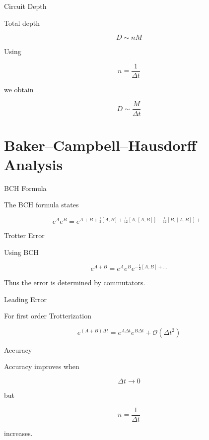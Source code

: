 \documentclass{beamer}
\begin{document}
\begin{frame}{Circuit Depth}

  Total depth

  \[
  D \sim n M
  \]

  Using

  \[
  n = \frac{1}{\Delta t}
  \]

  we obtain

  \[
  D \sim \frac{M}{\Delta t}
  \]

\end{frame}

\section{Baker–Campbell–Hausdorff Analysis}

\begin{frame}{BCH Formula}

  The BCH formula states

  \[
  e^A e^B
  =
  e^{A+B+\frac12[A,B]+\frac1{12}[A,[A,B]]-\frac1{12}[B,[A,B]]+\dots}
  \]

\end{frame}

\begin{frame}{Trotter Error}

  Using BCH

  \[
  e^{A+B}
  =
  e^A e^B e^{- \frac12[A,B] + \dots}
  \]

  Thus the error is determined by commutators.

\end{frame}

\begin{frame}{Leading Error}

  For first order Trotterization

  \[
  e^{(A+B)\Delta t}
  =
  e^{A\Delta t}e^{B\Delta t}
  +
  \mathcal{O}(\Delta t^2)
  \]

\end{frame}

\begin{frame}{Accuracy}

  Accuracy improves when

  \[
  \Delta t \rightarrow 0
  \]

  but

  \[
  n = \frac{1}{\Delta t}
  \]

  increases.

\end{frame}
\end{document}
